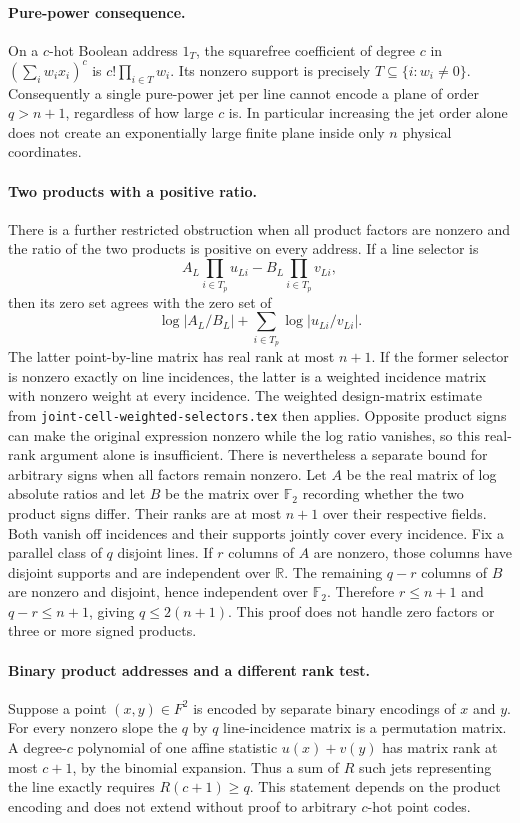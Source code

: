 \documentclass{article}
\begin{document}
\paragraph{Pure-power consequence.}
On a $c$-hot Boolean address $1_T$, the squarefree coefficient of degree
$c$ in $(\sum_iw_i x_i)^c$ is $c!\prod_{i\in T}w_i$.
Its nonzero support is precisely $T\subseteq\{i:w_i\ne0\}$.
Consequently a single pure-power jet per line cannot encode a plane of
order $q>n+1$, regardless of how large $c$ is.  In particular increasing
the jet order alone does not create an exponentially large finite plane
inside only $n$ physical coordinates.

\paragraph{Two products with a positive ratio.}
There is a further restricted obstruction when all product factors are
nonzero and the ratio of the two products is positive on every address.
If a line selector is
\[
A_L\prod_{i\in T_p}u_{Li}-B_L\prod_{i\in T_p}v_{Li},
\]
then its zero set agrees with the zero set of
\[
\log|A_L/B_L|+\sum_{i\in T_p}\log|u_{Li}/v_{Li}|.
\]
The latter point-by-line matrix has real rank at most $n+1$.
If the former selector is nonzero exactly on line incidences, the latter
is a weighted incidence matrix with nonzero weight at every incidence.
The weighted design-matrix estimate from
\texttt{joint-cell-weighted-selectors.tex} then applies.
Opposite product signs can make the original expression nonzero while the
log ratio vanishes, so this real-rank argument alone is insufficient.
There is nevertheless a separate bound for arbitrary signs when all
factors remain nonzero.  Let $A$ be the real matrix of log absolute
ratios and let $B$ be the matrix over $\mathbb F_2$ recording whether
the two product signs differ.  Their ranks are at most $n+1$ over their
respective fields.  Both vanish off incidences and their supports jointly
cover every incidence.  Fix a parallel class of $q$ disjoint lines.  If
$r$ columns of $A$ are nonzero, those columns have disjoint supports and
are independent over $\mathbb R$.  The remaining $q-r$ columns of $B$
are nonzero and disjoint, hence independent over $\mathbb F_2$.
Therefore $r\leq n+1$ and $q-r\leq n+1$, giving $q\leq2(n+1)$.
This proof does not handle zero factors or three or more signed products.

\paragraph{Binary product addresses and a different rank test.}
Suppose a point $(x,y)\in F^2$ is encoded by separate binary encodings
of $x$ and $y$.  For every nonzero slope the $q$ by $q$ line-incidence
matrix is a permutation matrix.  A degree-$c$ polynomial of one affine
statistic $u(x)+v(y)$ has matrix rank at most $c+1$, by the binomial
expansion.  Thus a sum of $R$ such jets representing the line exactly
requires $R(c+1)\geq q$.
This statement depends on the product encoding and does not extend
without proof to arbitrary $c$-hot point codes.
\end{document}
